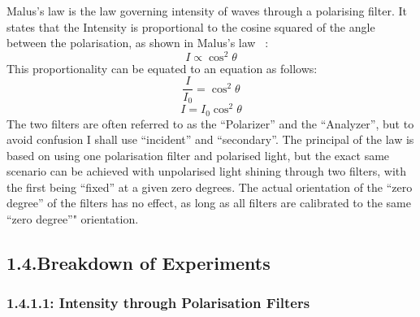 \documentclass{article}
\begin{document}
\noindent{}Malus's law is the law governing intensity of waves through a polarising filter. It states that the Intensity is proportional to the cosine squared of the angle between the polarisation, as shown in Malus's law~ :%
\label{malus}%
\noindent{}
\noindent\[%
I\propto\cos^2\theta
\]%
\noindent{}This proportionality can be equated to an equation as follows:
\label{derive}%
\noindent{}
\noindent\[%
\frac{I}{I_0}=\cos^2\theta
\]%
\label{}%
\noindent{}
\noindent\[%
I=I_0\cos^2\theta
\]%
\noindent{}The two filters are often referred to as the \textquotedblleft{}Polarizer\textquotedblright{} and the \textquotedblleft{}Analyzer\textquotedblright{}, but to avoid confusion I shall use \textquotedblleft{}incident\textquotedblright{} and \textquotedblleft{}secondary\textquotedblright{}. The principal of the law is based on using one polarisation filter and polarised light, but the exact same scenario can be achieved with unpolarised light shining through two filters, with the first being \textquotedblleft{}fixed\textquotedblright{} at a given zero degrees. The actual orientation of the \textquotedblleft{}zero degree\textquotedblright{} of the filters has no effect, as long as all filters are calibrated to the same \textquotedblleft{}zero degree\textquotedblright{}" orientation.

\subsection{1.4.\hspace*{0.5em}Breakdown of Experiments}\label{sec-breakdown-of-experiments}%

\subsubsection{1.4.1.\hspace*{0.5em}1: Intensity through Polarisation Filters}\label{sec-1--intensity-through-polarisation-filters}%
\end{document}
